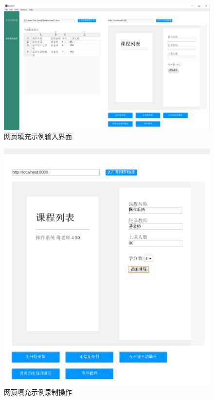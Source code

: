 \documentclass[design, pageheader]{njubachelor}
\begin{document}
\begin{figure}[!htbp]
    \centering
    \includegraphics[width=15cm,keepaspectratio]{figures/ui_2_input.png}
    \caption{网页填充示例输入界面}
    \label{fig:ui_2_input}
\end{figure}
\begin{figure}[!htbp]
    \centering
    \includegraphics[width=15cm,keepaspectratio]{figures/ui_2_record.png}
    \caption{网页填充示例录制操作}
    \label{fig:ui_2_record}
\end{figure}
\end{document}
